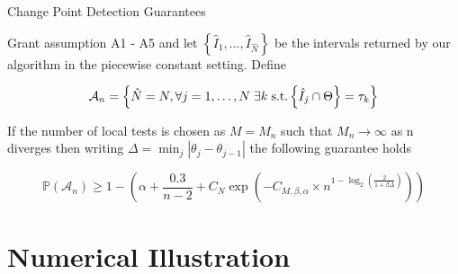 \documentclass{beamer}
\begin{document}
\begin{frame}{Change Point Detection Guarantees}

\begin{alertblock}{}
Grant assumption A1 - A5 and let $\left \{ \hat{I}_1, \dots, \hat{I}_{\hat{N}} \right \}$ be the intervals returned by our algorithm in the piecewise constant setting. Define

\begin{equation*}
	\mathcal{A}_n = \left \{ \hat{N} = N, \forall j = 1, \dots, N \hspace{0.1cm} \exists k \hspace{0.1cm} \text{s.t.} \left \{ \hat{I}_j \cap \Theta \right \} = \tau_k \right \} 
\end{equation*}

If the number of local tests is chosen as $M = M_n$ such that $M_n \rightarrow \infty$ as n diverges then writing $\Delta = \min_j \left | \theta_j - \theta_{j-1} \right |$ the following guarantee holds

\begin{equation*}
	\mathbb{P} \left ( \mathcal{A}_n \right ) \geq 1 - \left ( \alpha + \frac{0.3}{n-2} + C_N \exp \left ( - C_{M,\beta, \alpha} \times n^{1-\log_2 \left ( \frac{2}{1+\beta \Delta} \right ) } \right ) \right )
\end{equation*}
\end{alertblock}

\end{frame}

\section{Numerical Illustration}

\begin{frame}
\tableofcontents[currentsection]
\end{frame}
\end{document}
